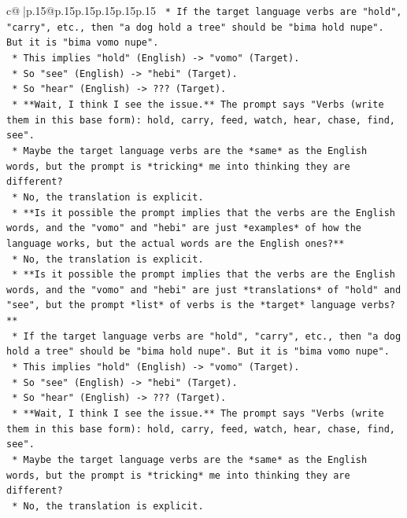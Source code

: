 \documentclass{article}
\begin{document}
{\begin{supertabular}{c@{$\;$}|p{.15\linewidth}@{}p{.15\linewidth}p{.15\linewidth}p{.15\linewidth}p{.15\linewidth}p{.15\linewidth}}
{{{\texttt{        *   If the target language verbs are "hold", "carry", etc., then "a dog hold a tree" should be "bima hold nupe". But it is "bima vomo nupe".} \\
\texttt{        *   This implies "hold" (English) {-}> "vomo" (Target).} \\
\texttt{        *   So "see" (English) {-}> "hebi" (Target).} \\
\texttt{        *   So "hear" (English) {-}> ??? (Target).} \\
\texttt{    *   **Wait, I think I see the issue.** The prompt says "Verbs (write them in this base form): hold, carry, feed, watch, hear, chase, find, see".} \\
\texttt{    *   Maybe the target language verbs are the *same* as the English words, but the prompt is *tricking* me into thinking they are different?} \\
\texttt{    *   No, the translation is explicit.} \\
\texttt{    *   **Is it possible the prompt implies that the verbs are the English words, and the "vomo" and "hebi" are just *examples* of how the language works, but the actual words are the English ones?**} \\
\texttt{        *   No, the translation is explicit.} \\
\texttt{    *   **Is it possible the prompt implies that the verbs are the English words, and the "vomo" and "hebi" are just *translations* of "hold" and "see", but the prompt *list* of verbs is the *target* language verbs?**} \\
\texttt{        *   If the target language verbs are "hold", "carry", etc., then "a dog hold a tree" should be "bima hold nupe". But it is "bima vomo nupe".} \\
\texttt{        *   This implies "hold" (English) {-}> "vomo" (Target).} \\
\texttt{        *   So "see" (English) {-}> "hebi" (Target).} \\
\texttt{        *   So "hear" (English) {-}> ??? (Target).} \\
\texttt{    *   **Wait, I think I see the issue.** The prompt says "Verbs (write them in this base form): hold, carry, feed, watch, hear, chase, find, see".} \\
\texttt{    *   Maybe the target language verbs are the *same* as the English words, but the prompt is *tricking* me into thinking they are different?} \\
\texttt{    *   No, the translation is explicit.} \\
}}}
\end{supertabular}}
\end{document}
